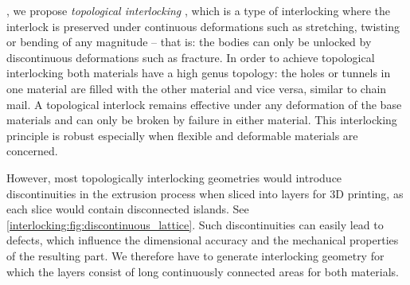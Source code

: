 , we propose \emph{topological interlocking}
{, which is a type of interlocking where the interlock is preserved under continuous deformations such as stretching, twisting or bending of any magnitude 
-- that is: the bodies can only be unlocked by discontinuous deformations such as fracture.
In order to achieve topological interlocking both materials have a high genus topology:}
the holes or tunnels in one material are filled with the other material and vice versa,
similar to chain mail.
A topological interlock remains effective under any deformation of the base materials and can only be broken by failure in either material.
This interlocking principle is robust especially when flexible and deformable materials are concerned.


However, most topologically interlocking geometries would introduce discontinuities in the extrusion process when sliced into layers for 3D printing, as each slice would contain disconnected islands.
See \cref{interlocking:fig:discontinuous_lattice}.
Such discontinuities can easily lead to defects, which influence the dimensional accuracy and the mechanical properties of the resulting part.
We therefore have to generate interlocking geometry for which the layers consist of long continuously connected areas for both materials.


